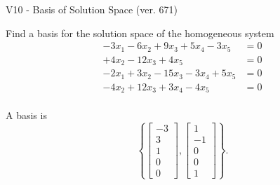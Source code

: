 \begin{exercise}
  \begin{exerciseTitle}V10 - Basis of Solution Space (ver. 671)\end{exerciseTitle}
  \begin{exerciseStatement}
    Find a basis for the solution space of the homogeneous system 
\begin{align*}
 -3 x_ 1 -6 x_ 2 + 9 x_ 3 + 5 x_ 4 -3 x_ 5 &= 0  \\ 
  + 4 x_ 2 -12 x_ 3 + 4 x_ 5 &= 0  \\ 
  -2 x_ 1 + 3 x_ 2 -15 x_ 3 -3 x_ 4 + 5 x_ 5 &= 0  \\ 
  -4 x_ 2 + 12 x_ 3 + 3 x_ 4 -4 x_ 5 &= 0  \\ 
 \end{align*}


 
  \end{exerciseStatement}

  \begin{exerciseAnswer}
   A basis is   
\[\left\{\left[\begin{array}{c}
-3 \\
3 \\
1 \\
0 \\
0
\end{array}\right] , \left[\begin{array}{c}
1 \\
-1 \\
0 \\
0 \\
1
\end{array}\right]\right\}.\]

  


  \end{exerciseAnswer}
\end{exercise}